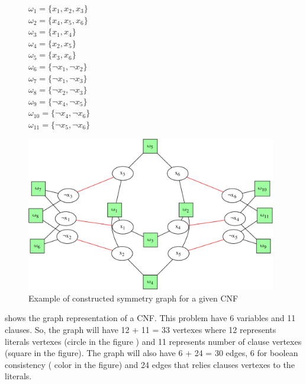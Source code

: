 \begin{figure}[h!]
	\begin{minipage}[c]{.2\textwidth}
		$\omega_{1} = \{ x_{1}, x_{2}, x_{3} \}$ \\
		$\omega_{2} = \{ x_{4}, x_{5}, x_{6} \}$ \\
		$\omega_{3} = \{ x_{1}, x_{4} \}$ \\
		$\omega_{4} = \{ x_{2}, x_{5} \}$ \\
		$\omega_{5} = \{ x_{3}, x_{6} \}$ \\
		$\omega_{6} = \{ \neg x_{1}, \neg x_{2} \}$ \\
		$\omega_{7} = \{ \neg x_{1}, \neg x_{3} \}$ \\
		$\omega_{8} = \{ \neg x_{2}, \neg x_{3} \}$ \\
		$\omega_{9} = \{ \neg x_{4}, \neg x_{5} \}$ \\
		$\omega_{10} = \{ \neg x_{4}, \neg x_{6} \}$ \\
		$\omega_{11} = \{ \neg x_{5}, \neg x_{6} \}$ \\
		
	\end{minipage}
	\begin{minipage}[l]{.75\textwidth}
		\includegraphics[width=4.3in]{cnfs/graph_cnf_no_opt-crop}
	\end{minipage}
 \caption{Example of constructed symmetry graph for a given CNF}
 \label{fig:graph_no_opt}
\end{figure}


 shows the graph representation of a CNF. This problem have 6 variables and 11
clauses. So, the graph will have  12  + 11 = 33 vertexes where 12 represents literals vertexes (circle in the figure ) 
and 11 represents number of clause vertexes (square in the figure). The graph will also have 6 + 24 = 30 edges, 6 for boolean consistency 
( color in the figure) and 24 edges that relies clauses vertexes to the literals.


